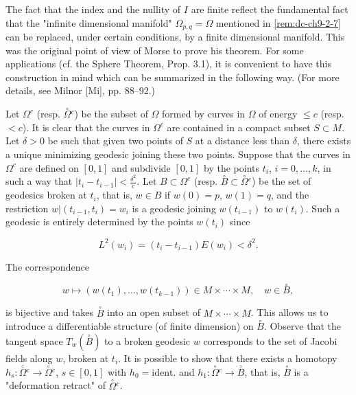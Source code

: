 \begin{remark}[Remark 2.12]
  \label{rem:dc-ch11-2-12}
  The fact that the index and the nullity of $I$ are finite reflect the fundamental
  fact that the "infinite dimensional manifold" $\Omega_{p,q}=\Omega$ mentioned in
  \cref{rem:dc-ch9-2-7} can be replaced, under certain conditions, by a finite
  dimensional manifold. This was the original point of view of Morse to prove his
  theorem. For some applications (cf. the Sphere Theorem, Prop. 3.1), it is
  convenient to have this construction in mind which can be summarized in the
  following way. (For more details, see Milnor [Mi], pp. 88–92.)
  
  Let $\Omega^c$ (resp. $\overset{\circ}{\Omega}{}^c$) be the subset of $\Omega$
  formed by curves in $\Omega$ of energy $\leq c$ (resp. $<c$). It is clear that the
  curves in $\Omega^c$ are contained in a compact subset $S\subset M$. Let
  $\delta>0$ be such that given two points of $S$ at a distance less than $\delta$,
  there exists a unique minimizing geodesic joining these two points. Suppose that
  the curves in $\Omega^c$ are defined on $[0,1]$ and subdivide $[0,1]$ by the
  points $t_i$, $i=0,\dots,k$, in such a way that
  $|t_i-t_{i-1}|<\frac{\delta^2}{c}$. Let $B\subset\Omega^c$ (resp.
  $\overset{\circ}{B}\subset\overset{\circ}{\Omega}{}^c$) be the set of geodesics
  broken at $t_i$, that is, $w\in B$ if $w(0)=p$, $w(1)=q$, and the restriction
  $w|(t_{i-1},t_i)=w_i$ is a geodesic joining $w(t_{i-1})$ to $w(t_i)$. Such a
  geodesic is entirely determined by the points $w(t_i)$ since
  
  $$
  L^2(w_i)=(t_i-t_{i-1})E(w_i)<\delta^2.
  $$
  
  The correspondence
  
  $$
  w\mapsto(w(t_1),\dots,w(t_{k-1}))\in M\times\cdots\times M,\quad w\in\overset{\circ}{B},
  $$
  
  is bijective and takes $\overset{\circ}{B}$ into an open subset of
  $M\times\cdots\times M$. This allows us to introduce a differentiable structure
  (of finite dimension) on $\overset{\circ}{B}$. Observe that the tangent space
  $T_w(\overset{\circ}{B})$ to a broken geodesic $w$ corresponds to the set of
  Jacobi fields along $w$, broken at $t_i$. It is possible to show that there
  exists a homotopy
  $h_s:\overset{\circ}{\Omega}{}^c\to\overset{\circ}{\Omega}{}^c$, $s\in[0,1]$ with
  $h_0=\mathrm{ident.}$ and $h_1:\overset{\circ}{\Omega}{}^c\to\overset{\circ}{B}$,
  that is, $\overset{\circ}{B}$ is a "deformation retract" of
  $\overset{\circ}{\Omega}{}^c$.
  

\end{remark}
